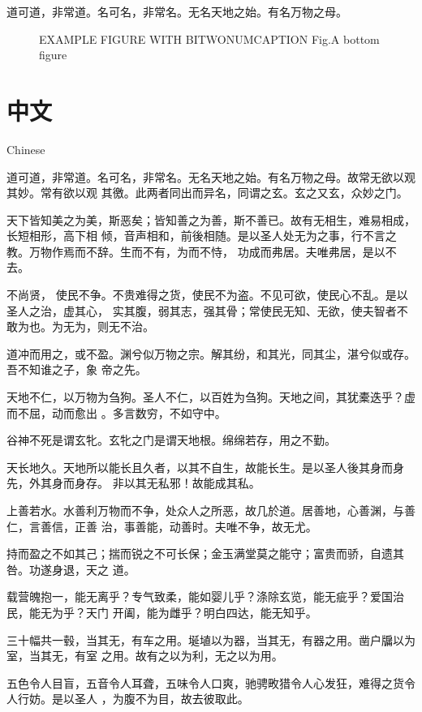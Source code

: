 \documentclass[a4paper, twoside, openany, extrafontsizes]{dlutthesis}
\begin{document}
道可道，非常道。名可名，非常名。无名天地之始。有名万物之母。

\begin{figure}[b]
	\centering
	EXAMPLE FIGURE WITH BITWONUMCAPTION
		{Fig.}{A bottom figure}
\end{figure}



\chapter{中文}{Chinese} %


道可道，非常道。名可名，非常名。无名天地之始。有名万物之母。故常无欲以观其妙。常有欲以观
其徼。此两者同出而异名，同谓之玄。玄之又玄，众妙之门。

天下皆知美之为美，斯恶矣；皆知善之为善，斯不善已。故有无相生，难易相成，长短相形，高下相
倾，音声相和，前後相随。是以圣人处无为之事，行不言之教。万物作焉而不辞。生而不有，为而不恃，
功成而弗居。夫唯弗居，是以不去。

不尚贤， 使民不争。不贵难得之货，使民不为盗。不见可欲，使民心不乱。是以圣人之治，虚其心，
实其腹，弱其志，强其骨；常使民无知、无欲，使夫智者不敢为也。为无为，则无不治。

道冲而用之，或不盈。渊兮似万物之宗。解其纷，和其光，同其尘，湛兮似或存。吾不知谁之子，象
帝之先。

天地不仁，以万物为刍狗。圣人不仁，以百姓为刍狗。天地之间，其犹橐迭乎？虚而不屈，动而愈出
。多言数穷，不如守中。

谷神不死是谓玄牝。玄牝之门是谓天地根。绵绵若存，用之不勤。

天长地久。天地所以能长且久者，以其不自生，故能长生。是以圣人後其身而身先，外其身而身存。
非以其无私邪！故能成其私。

上善若水。水善利万物而不争，处众人之所恶，故几於道。居善地，心善渊，与善仁，言善信，正善
治，事善能，动善时。夫唯不争，故无尤。

持而盈之不如其己；揣而锐之不可长保；金玉满堂莫之能守；富贵而骄，自遗其咎。功遂身退，天之
道。

载营魄抱一，能无离乎？专气致柔，能如婴儿乎？涤除玄览，能无疵乎？爱国治民，能无为乎？天门
开阖，能为雌乎？明白四达，能无知乎。

三十幅共一毂，当其无，有车之用。埏埴以为器，当其无，有器之用。凿户牖以为室，当其无，有室
之用。故有之以为利，无之以为用。

五色令人目盲，五音令人耳聋，五味令人口爽，驰骋畋猎令人心发狂，难得之货令人行妨。是以圣人
，为腹不为目，故去彼取此。
\end{document}
